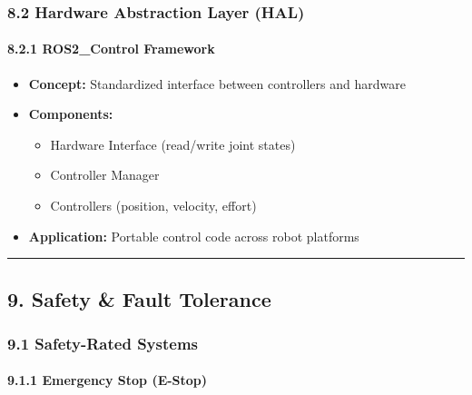 \documentclass[
]{article}
\providecommand{\tightlist}{%
  \setlength{\itemsep}{0pt}\setlength{\parskip}{0pt}}
\begin{document}
\hypertarget{hardware-abstraction-layer-hal}{%
\subsubsection{8.2 Hardware Abstraction Layer
(HAL)}\label{hardware-abstraction-layer-hal}}

\hypertarget{ros2_control-framework}{%
\paragraph{8.2.1 ROS2\_Control Framework}\label{ros2_control-framework}}

\begin{itemize}
\tightlist
\item
  \textbf{Concept:} Standardized interface between controllers and
  hardware
\item
  \textbf{Components:}

  \begin{itemize}
  \tightlist
  \item
    Hardware Interface (read/write joint states)
  \item
    Controller Manager
  \item
    Controllers (position, velocity, effort)
  \end{itemize}
\item
  \textbf{Application:} Portable control code across robot platforms
\end{itemize}

\begin{center}\rule{0.5\linewidth}{0.5pt}\end{center}

\hypertarget{safety-fault-tolerance}{%
\subsection{9. Safety \& Fault Tolerance}\label{safety-fault-tolerance}}

\hypertarget{safety-rated-systems}{%
\subsubsection{9.1 Safety-Rated Systems}\label{safety-rated-systems}}

\hypertarget{emergency-stop-e-stop}{%
\paragraph{9.1.1 Emergency Stop (E-Stop)}\label{emergency-stop-e-stop}}
\end{document}
